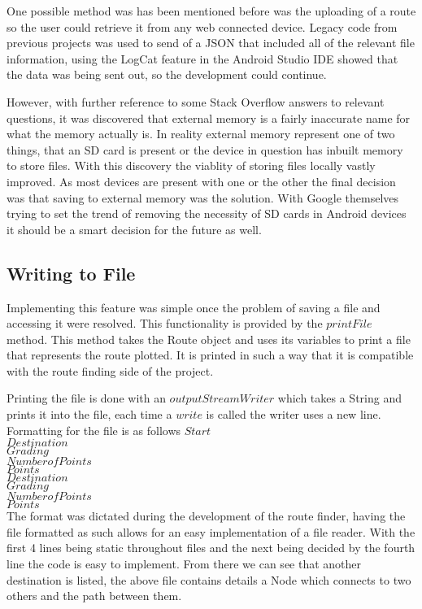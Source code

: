 One possible method was has been mentioned before was the uploading of a route so the user could retrieve it from any web connected device. Legacy code from previous projects was used to send of a JSON that included all of the relevant file information, using the LogCat feature in the Android Studio IDE showed that the data was being sent out, so the development could continue.

However, with further reference to some Stack Overflow answers to relevant questions, it was discovered that external memory is a fairly inaccurate name for what the memory actually is. In reality external memory represent one of two things, that an SD card is present or the device in question has inbuilt memory to store files. With this discovery the viablity of storing files locally vastly improved. As most devices are present with one or the other the final decision was that saving to external memory was the solution. With Google themselves trying to set the trend of removing the necessity of SD cards in Android devices it should be a smart decision for the future as well. 

\subsection{Writing to File}
Implementing this feature was simple once the problem of saving a file and accessing it were resolved. This functionality is provided by the $printFile$ method. This method takes the Route object and uses its variables to print a file that represents the route plotted. It is printed in such a way that it is compatible with the route finding side of the project. 

Printing the file is done with an $outputStreamWriter$ which takes a String and prints it into the file, each time a $write$ is called the writer uses a new line. Formatting for the file is as follows
$Start$\\
$Destination$\\
$Grading$\\
$Number of Points$\\
$Points$\\
$Destination$\\
$Grading$\\
$Number of Points$\\
$Points$\\
The format was dictated during the development of the route finder, having the file formatted as such allows for an easy implementation of a file reader. With the first 4 lines being static throughout files and the next being decided by the fourth line the code is easy to implement. From there we can see that another destination is listed, the above file contains details a Node which connects to two others and the path between them. 

